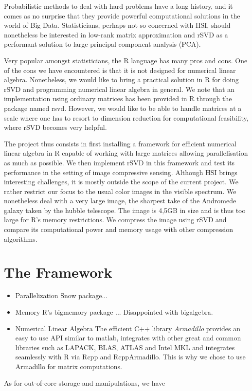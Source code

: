 \documentclass[a4paper,11pt]{amsart}
\begin{document}
Probabilistic methods to deal with hard problems have a long history, and it comes as no surprise that they provide powerful computational solutions in the world of Big Data. Statisticians, perhaps not so concerned with HSI, should nonetheless be interested in low-rank matrix approximation and rSVD as a performant solution to large principal component analysis (PCA).

Very popular amongst statisticians, the R language has many pros and cons. One of the cons we have encountered is that it is not designed for numerical linear algebra. Nonetheless, we would like to bring a practical solution in R for doing rSVD and programming numerical linear algebra in general. We note that an implementation using ordinary matrices has been provided in R through the package named rsvd. However, we would like to be able to handle matrices at a scale where one has to resort to dimension reduction for computational feasibility, where rSVD becomes very helpful. 

The project thus consists in first installing a framework for efficient numerical linear algebra in R capable of working with large matrices allowing parallelisation as much as possible. We then implement rSVD in this framework and test its performance in the setting of image compressive sensing. Although HSI brings interesting challenges, it is mostly outside the scope of the current project. We rather restrict our focus to the usual color images in the visible spectrum. We nonetheless deal with a very large image, the sharpest take of the Andromede galaxy taken by the hubble telescope. The image is 4,5GB in size and is thus too large for R's memory restrictions. We compress the image using rSVD and compare its computational power and memory usage with other compression algorithms.  

\section{The Framework}

\begin{itemize}
  \item{Parallelization} Snow package...
  \item{Memory} R's bigmemory package ... Disappointed with bigalgebra.
  \item{Numerical Linear Algebra} The efficient C++ library \emph{Armadillo} provides an easy to use API similar to matlab, integrates with other great and common libraries such as LAPACK, BLAS, ATLAS and Intel MKL and integrates seamlessly with R via Rcpp and RcppArmadillo. This is why we chose to use Armadillo for matrix computations. 
\end{itemize}

As for out-of-core storage and manipulations, we have 
\end{document}
